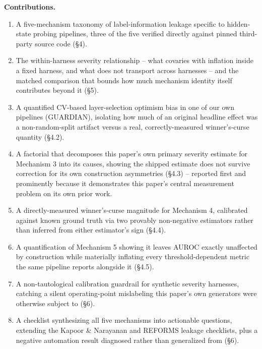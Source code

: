 \documentclass[10pt]{article} %
\begin{document}
\textbf{Contributions.}
\begin{enumerate}
\itemsep0pt
\item A five-mechanism taxonomy of label-information leakage specific to
   hidden-state probing pipelines, three of the five verified directly
   against pinned third-party source code (§4).
\item The within-harness severity relationship -- what covaries with
   inflation inside a fixed harness, and what does not transport across
   harnesses -- and the matched comparison that bounds how much mechanism
   identity itself contributes beyond it (§5).
\item A quantified CV-based layer-selection optimism bias in one of our
   own pipelines (GUARDIAN), isolating how much of an original headline
   effect was a non-random-split artifact versus a real, correctly-measured
   winner's-curse quantity (§4.2).
\item A factorial that decomposes this paper's own primary severity
   estimate for Mechanism 3 into its causes, showing the shipped estimate
   does not survive correction for its own construction asymmetries (§4.3)
   -- reported first and prominently because it demonstrates this paper's
   central measurement problem on its own prior work.
\item A directly-measured winner's-curse magnitude for Mechanism 4,
   calibrated against known ground truth via two provably non-negative
   estimators rather than inferred from either estimator's sign (§4.4).
\item A quantification of Mechanism 5 showing it leaves AUROC exactly
   unaffected by construction while materially inflating every
   threshold-dependent metric the same pipeline reports alongside it (§4.5).
\item A non-tautological calibration guardrail for synthetic severity
   harnesses, catching a silent operating-point mislabeling this paper's
   own generators were otherwise subject to (§6).
\item A checklist synthesizing all five mechanisms into actionable
   questions, extending the Kapoor \& Narayanan and REFORMS leakage
   checklists, plus a negative automation result diagnosed rather than
   generalized from (§6).
\end{enumerate}
\end{document}
